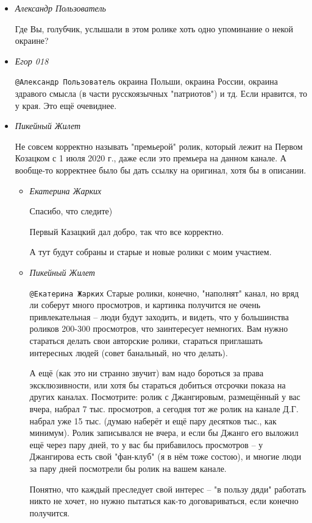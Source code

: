 \begin{itemize}
\item \emph{Александр Пользователь}

Где Вы, голубчик, услышали в этом ролике хоть одно упоминание о некой окраине?

\item \emph{Егор 018}

\verb|@Александр Пользователь|  окраина Польши, окраина  России, окраина
здравого смысла (в части русскоязычных "патриотов") и тд. Если нравится, то у
края. Это ещё очевиднее.

\item \emph{Пикейный Жилет}

Не совсем корректно называть "премьерой" ролик, который лежит на Первом
Козацком с 1 июля 2020 г., даже если это премьера на данном канале. А вообще-то
корректнее было бы дать ссылку на оригинал, хотя бы в описании.

\begin{itemize}
\item \emph{Екатерина Жарких}

Спасибо, что следите)

Первый Казацкий дал добро, так что все корректно. 

А тут будут собраны и старые и новые ролики с моим участием.

\item \emph{Пикейный Жилет}

\verb|@Екатерина Жарких|  Старые ролики, конечно, "наполнят" канал, но вряд ли
соберут много просмотров, и картинка получится не очень привлекательная --
люди будут заходить, и видеть, что у большинства роликов 200-300 просмотров,
что заинтересует немногих. Вам нужно стараться делать свои авторские ролики,
стараться приглашать интересных людей (совет банальный, но что делать). 

А ещё (как это ни странно звучит) вам надо бороться за права эксклюзивности,
или хотя бы стараться добиться отсрочки показа на других каналах. Посмотрите:
ролик с Джангировым, размещённый у вас вчера, набрал 7 тыс. просмотров, а
сегодня тот же ролик на канале Д.Г. набрал уже 15 тыс. (думаю наберёт и ещё
пару десятков тыс., как минимум). Ролик записывался не вчера, и если бы Джанго
его выложил ещё через пару дней, то у вас бы прибавилось просмотров -- у
Джангирова есть свой "фан-клуб" (я в нём тоже состою), и многие люди за пару
дней посмотрели бы ролик на вашем канале.

Понятно, что каждый преследует свой интерес -- "в пользу дяди" работать никто
не хочет, но нужно пытаться как-то договариваться, если конечно получится.


\end{itemize}
\end{itemize}
